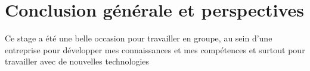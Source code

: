 \chapter*{Conclusion générale et perspectives}

Ce stage a été une belle occasion pour travailler en groupe, au
sein d’une entreprise pour développer mes connaissances et
mes compétences et surtout pour travailler avec de nouvelles
technologies

